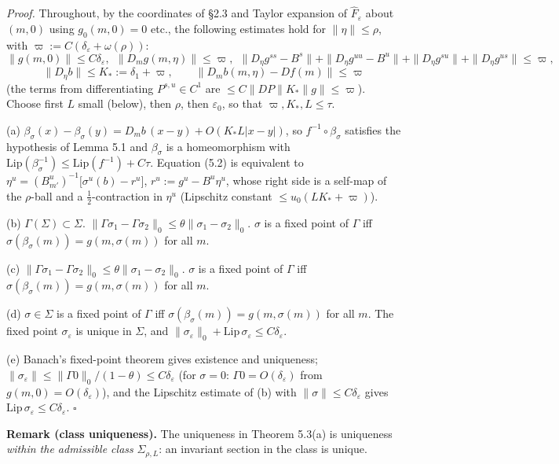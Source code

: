\documentclass[11pt,a4paper]{article}
\theoremstyle{plain}
\theoremstyle{definition}
\theoremstyle{remark}
\numberwithin{equation}{section}
\numberwithin{figure}{section}
\begin{document}
\textit{Proof.} Throughout, by the coordinates of §2.3 and Taylor expansion of $\widehat F_\varepsilon$ about $(m,0)$ using $g_0(m,0)=0$ etc., the following estimates hold for $\|\eta\|\le\rho$, with $\varpi:=C(\delta_\varepsilon+\omega(\rho))$:
\[
\|g(m,0)\|\le C\delta_\varepsilon,\ \ \|D_mg(m,\eta)\|\le\varpi,\ \ \|D_\eta g^{ss}-B^s\|+\|D_\eta g^{uu}-B^u\|+\|D_\eta g^{su}\|+\|D_\eta g^{us}\|\le\varpi,
\]
\[
\|D_\eta b\|\le K_*:=\delta_1+\varpi,\qquad\|D_mb(m,\eta)-Df(m)\|\le\varpi
\]
(the terms from differentiating $P^{s,u}\in C^1$ are $\le C\|DP\|K_*\|g\|\le\varpi$). Choose first $L$ small (below), then $\rho$, then $\varepsilon_0$, so that $\varpi,K_*,L\le\tau$.

(a) $\beta_\sigma(x)-\beta_\sigma(y)=D_mb\,(x-y)+O(K_*L|x-y|)$, so $f^{-1}\circ\beta_\sigma$ satisfies the hypothesis of Lemma 5.1 and $\beta_\sigma$ is a homeomorphism with $\mathrm{Lip}(\beta_\sigma^{-1})\le\mathrm{Lip}(f^{-1})+C\tau$. Equation (5.2) is equivalent to $\eta^u=(B^u_{m'})^{-1}\big[\sigma^u(b)-r^u\big]$, $r^u:=g^u-B^u\eta^u$, whose right side is a self-map of the $\rho$-ball and a $\tfrac12$-contraction in $\eta^u$ (Lipschitz constant $\le u_0(LK_*+\varpi)$).

(b) $\Gamma(\Sigma)\subset\Sigma$. $\|\Gamma\sigma_1-\Gamma\sigma_2\|_0\le\theta\|\sigma_1-\sigma_2\|_0$. $\sigma$ is a fixed point of $\Gamma$ iff $\sigma(\beta_\sigma(m))=g(m,\sigma(m))$ for all $m$.

(c) $\|\Gamma\sigma_1-\Gamma\sigma_2\|_0\le\theta\|\sigma_1-\sigma_2\|_0$. $\sigma$ is a fixed point of $\Gamma$ iff $\sigma(\beta_\sigma(m))=g(m,\sigma(m))$ for all $m$.

(d) $\sigma\in\Sigma$ is a fixed point of $\Gamma$ iff $\sigma(\beta_\sigma(m))=g(m,\sigma(m))$ for all $m$. The fixed point $\sigma_\varepsilon$ is unique in $\Sigma$, and $\|\sigma_\varepsilon\|_0+\mathrm{Lip}\,\sigma_\varepsilon\le C\delta_\varepsilon$.

(e) Banach's fixed-point theorem gives existence and uniqueness; $\|\sigma_\varepsilon\|\le\|\Gamma0\|_0/(1-\theta)\le C\delta_\varepsilon$ (for $\sigma=0$: $\Gamma0=O(\delta_\varepsilon)$ from $g(m,0)=O(\delta_\varepsilon)$), and the Lipschitz estimate of (b) with $\|\sigma\|\le C\delta_\varepsilon$ gives $\mathrm{Lip}\,\sigma_\varepsilon\le C\delta_\varepsilon$. $\square$

\textbf{Remark (class uniqueness).} The uniqueness in Theorem 5.3(a) is uniqueness \textit{within the admissible class} $\Sigma_{\rho,L}$: an invariant section in the class is unique.
\end{document}
